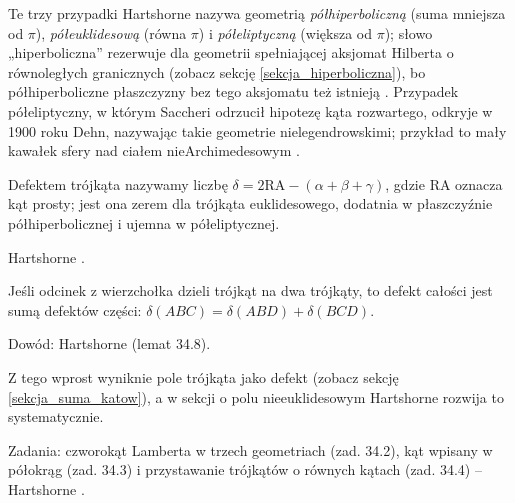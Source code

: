 Te trzy przypadki Hartshorne nazywa geometrią \emph{półhiperboliczną} (suma mniejsza od $\pi$), \emph{półeuklidesową} (równa $\pi$) i \emph{półeliptyczną} (większa od $\pi$); słowo „hiperboliczna'' rezerwuje dla geometrii spełniającej aksjomat Hilberta o równoległych granicznych (zobacz sekcję \ref{sekcja_hiperboliczna}), bo półhiperboliczne płaszczyzny bez tego aksjomatu też istnieją \cite[s. 311]{hartshorne_2000}. %
Przypadek półeliptyczny, w którym Saccheri odrzucił hipotezę kąta rozwartego, odkryje w 1900 roku Dehn, nazywając takie geometrie nielegendrowskimi; przykład to mały kawałek sfery nad ciałem nieArchimedesowym \cite[s. 311, 318]{hartshorne_2000}. %
%

\begin{definition}
	Defektem trójkąta nazywamy liczbę $\delta = 2\mathrm{RA} - (\alpha + \beta + \gamma)$, gdzie RA oznacza kąt prosty; jest ona zerem dla trójkąta euklidesowego, dodatnia w płaszczyźnie półhiperbolicznej i ujemna w półeliptycznej. %
\end{definition}

Hartshorne \cite[s. 311]{hartshorne_2000}. %

\begin{proposition}
	Jeśli odcinek z wierzchołka dzieli trójkąt na dwa trójkąty, to defekt całości jest sumą defektów części: $\delta(ABC) = \delta(ABD) + \delta(BCD)$. %
\end{proposition}

Dowód: Hartshorne \cite[s. 311--312]{hartshorne_2000} (lemat 34.8). %

Z tego wprost wyniknie pole trójkąta jako defekt (zobacz sekcję \ref{sekcja_suma_katow}), a w sekcji o polu nieeuklidesowym Hartshorne \cite[s. 326 nn.]{hartshorne_2000} rozwija to systematycznie. %

Zadania: czworokąt Lamberta w trzech geometriach (zad. 34.2), kąt wpisany w półokrąg (zad. 34.3) i przystawanie trójkątów o równych kątach (zad. 34.4) -- Hartshorne \cite[s. 316]{hartshorne_2000}. %

\color{black}
